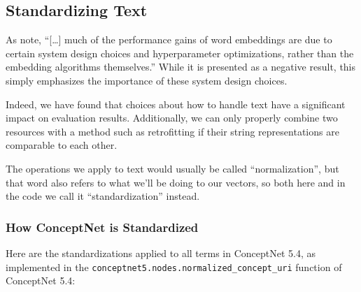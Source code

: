 \documentclass[letterpaper]{article}
\begin{document}
\subsection{Standardizing Text}

As  note,
``[\ldots] much of the performance gains of word embeddings are due to certain
system design choices and hyperparameter optimizations, rather than the
embedding algorithms themselves.'' While it is presented as a negative result,
this simply emphasizes the importance of these system design choices.

Indeed, we have found that choices about how to handle text have a significant
impact on evaluation results. Additionally, we can only properly combine two
resources with a method such as retrofitting if their string representations
are comparable to each other.

The operations we apply to text would usually be called ``normalization'',
but that word also refers to what we'll be doing to our vectors, so both
here and in the code we call it ``standardization'' instead.

\subsubsection{How ConceptNet is Standardized}

Here are the standardizations applied to all terms in ConceptNet 5.4, as
implemented in the {\tt conceptnet5.nodes.normalized\_concept\_uri} function
of ConceptNet 5.4:
\end{document}
